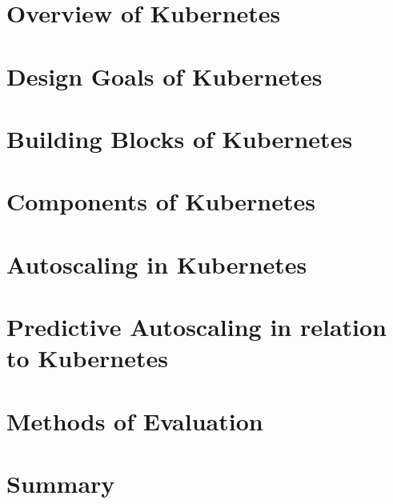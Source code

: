 \section{Overview of Kubernetes}



\section{Design Goals of Kubernetes}



\section{Building Blocks of Kubernetes}



\section{Components of Kubernetes}



\section{Autoscaling in Kubernetes}



\section{Predictive Autoscaling in relation to Kubernetes}



\section{Methods of Evaluation}



\section{Summary}


